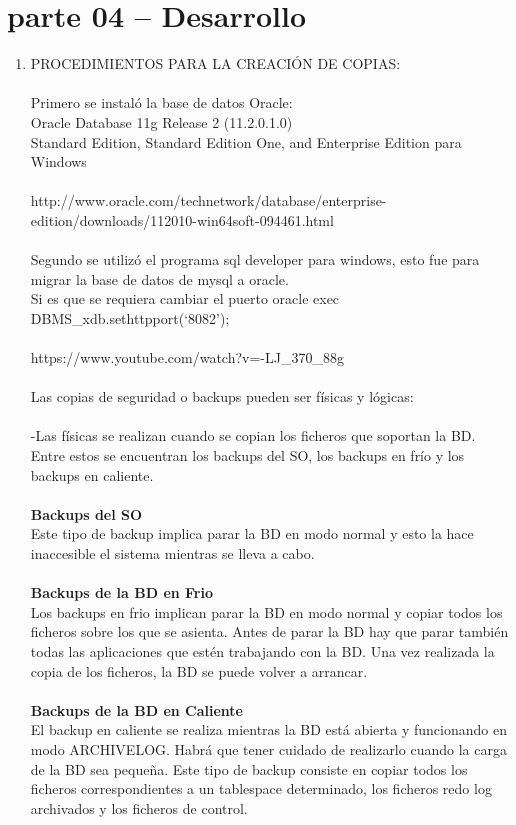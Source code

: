 \section{parte 04 – Desarrollo} 

\begin{enumerate}[1.]
	\item PROCEDIMIENTOS PARA LA CREACIÓN DE COPIAS:
\\
\\Primero se instaló la base de datos Oracle:
\\Oracle Database 11g Release 2 (11.2.0.1.0)
\\Standard Edition, Standard Edition One, and Enterprise Edition para Windows
\\
\\http://www.oracle.com/technetwork/database/enterprise-edition/downloads/112010-win64soft-094461.html
\\
\\Segundo se utilizó el programa sql developer para windows, esto fue para migrar la base de datos de mysql a oracle.
\\Si es que se requiera cambiar el puerto  oracle exec DBMS\_xdb.sethttpport(‘8082’);
\\
\\https://www.youtube.com/watch?v=-LJ\_370\_88g
\\
\\Las copias de seguridad o backups pueden ser físicas y lógicas:
\\
\\-Las físicas se realizan cuando se copian los ficheros que soportan la BD. Entre estos se encuentran los backups del SO, los backups en frío y los backups en caliente.
\\
\\
\textbf{ Backups del SO}         
\\           Este tipo de backup implica parar la BD en modo normal y esto la hace inaccesible el sistema mientras se lleva a cabo.
\\
\\
\textbf{ Backups de la BD en Frio}         
\\          Los backups en frio implican parar la BD en modo normal y copiar todos los ficheros sobre los que se asienta. Antes de parar la BD hay que parar también todas las aplicaciones que estén trabajando con la BD. Una vez realizada la copia de los ficheros, la BD se puede volver a arrancar.
\\
\\
\textbf{Backups de la BD en Caliente}            
\\          El backup en caliente se realiza mientras la BD está abierta y funcionando en modo ARCHIVELOG. Habrá que tener cuidado de realizarlo cuando la carga de la BD sea pequeña. Este tipo de backup consiste en copiar todos los ficheros correspondientes a un tablespace determinado, los ficheros redo log archivados y los ficheros de control.


\end{enumerate}
